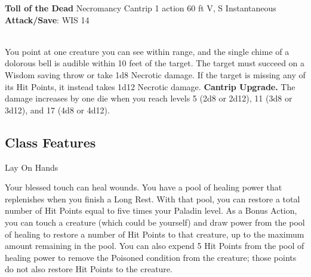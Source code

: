 \DndSpellHeader%
{\textbf{Toll of the Dead}}
{Necromancy Cantrip}
{1 action}
{60 ft}
{V, S}
{Instantaneous}
{\textbf{Attack/Save}: WIS 14}\\\

You point at one creature you can see within range, and the single chime of a dolorous bell is audible within 10 feet of the target. The target must succeed on a Wisdom saving throw or take 1d8 Necrotic damage. If the target is missing any of its Hit Points, it instead takes 1d12 Necrotic damage.
\textbf{Cantrip Upgrade.} The damage increases by one die when you reach levels 5 (2d8 or 2d12), 11 (3d8 or 3d12), and 17 (4d8 or 4d12).


\subsection {Class Features}
\begingroup
\DndSetThemeColor[PhbMauve]
\begin{DndComment}[]{Lay On Hands}

	Your blessed touch can heal wounds. You have a pool of healing power that replenishes when you finish a Long Rest. With that pool, you can restore a total number of Hit Points equal to five times your Paladin level.
	As a Bonus Action, you can touch a creature (which could be yourself) and draw power from the pool of healing to restore a number of Hit Points to that creature, up to the maximum amount remaining in the pool.
	You can also expend 5 Hit Points from the pool of healing power to remove the Poisoned condition from the creature; those points do not also restore Hit Points to the creature.

\end{DndComment}


